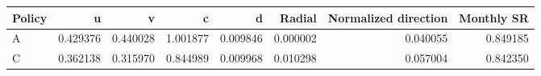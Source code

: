 \begin{tabular}{lrrrrrrr}
\toprule
Policy & u & v & c & d & Radial & Normalized direction & Monthly SR \\
\midrule
A & 0.429376 & 0.440028 & 1.001877 & 0.009846 & 0.000002 & 0.040055 & 0.849185 \\
C & 0.362138 & 0.315970 & 0.844989 & 0.009968 & 0.010298 & 0.057004 & 0.842350 \\
\bottomrule
\end{tabular}
